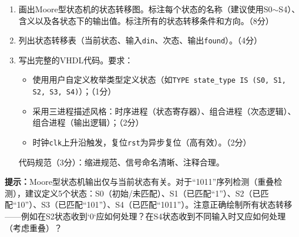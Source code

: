 \begin{enumerate}[label=(\arabic*)]
  \item 画出Moore型状态机的状态转移图。标注每个状态的名称（建议使用S0$\sim$S4）、含义以及各状态下的输出值。标注所有的状态转移条件和方向。（8分）
  \item 列出状态转移表（当前状态、输入\texttt{din}、次态、输出\texttt{found}）。（4分）
  \item 写出完整的VHDL代码。要求：
  \begin{itemize}
    \item 使用用户自定义枚举类型定义状态（如\texttt{TYPE state\_type IS (S0, S1, S2, S3, S4)}）；（1分）
    \item 采用三进程描述风格：时序进程（状态寄存器）、组合进程（次态逻辑）、组合进程（输出逻辑）；（2分）
    \item 时钟\texttt{clk}上升沿触发，复位\texttt{rst}为异步复位（高有效）。（2分）
  \end{itemize}
  代码规范（3分）：缩进规范、信号命名清晰、注释合理。
\end{enumerate}

\begin{framed}
\textbf{提示：}Moore型状态机输出仅与当前状态有关。对于``1011''序列检测（重叠检测），建议定义5个状态：S0（初始/未匹配）、S1（已匹配``1''）、S2（已匹配``10''）、S3（已匹配``101''）、S4（已匹配``1011''）。注意正确绘制所有状态转移——例如在S2状态收到`0`应如何处理？在S4状态收到不同输入时又应如何处理（考虑重叠）？
\end{framed}

\endinput
